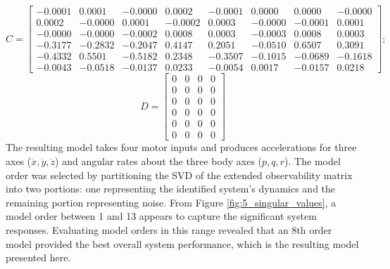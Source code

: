 \begin{equation*}
C = \begin{bmatrix}
-0.0001&0.0001&-0.0000&0.0002&-0.0001&0.0000&0.0000&-0.0000\\
0.0002&-0.0000&0.0001&-0.0002&0.0003&-0.0000&-0.0001&0.0001\\
-0.0000&-0.0000&-0.0002&0.0008&0.0003&-0.0003&0.0008&0.0003\\
-0.3177&-0.2832&-0.2047&0.4147&0.2051&-0.0510&0.6507&0.3091\\
-0.4332&0.5501&-0.5182&0.2348&-0.3507&-0.1015&-0.0689&-0.1618\\
-0.0043&-0.0518&-0.0137&0.0233&-0.0054&0.0017&-0.0157&0.0218
\end{bmatrix};
\end{equation*} 
\begin{equation*}
D = \begin{bmatrix}
0&0&0&0\\
0&0&0&0\\
0&0&0&0\\
0&0&0&0\\
0&0&0&0\\
0&0&0&0
\end{bmatrix}
\end{equation*}
\normalsize %
The resulting model takes four motor inputs and produces accelerations for three axes ($\ddot x, \ddot y, \ddot z$) and angular rates about the three body axes ($p, q, r$). The model order was selected by partitioning the SVD of the extended observability matrix into two portions: one representing the identified system's dynamics and the remaining portion representing noise. From Figure \ref{fig:5_singular_values}, a model order between 1 and 13 appears to capture the significant system responses. Evaluating model orders in this range revealed that an 8th order model provided the best overall system performance, which is the resulting model presented here. 








